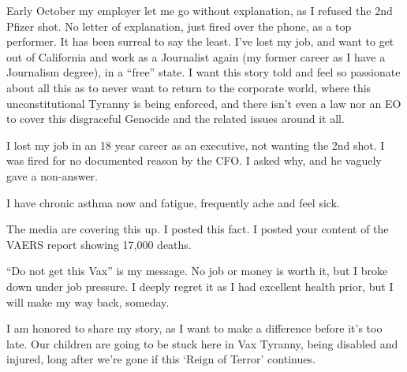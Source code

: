 Early October my employer let me go without explanation, as I refused the 2nd
Pfizer shot. No letter of explanation, just fired over the phone, as a top
performer. It has been surreal to say the least. I’ve lost my job, and want to
get out of California and work as a Journalist again (my former career as I have
a Journalism degree), in a “free” state. I want this story told and feel so
passionate about all this as to never want to return to the corporate world,
where this unconstitutional Tyranny is being enforced, and there isn’t even a
law nor an EO to cover this disgraceful Genocide and the related issues around
it all.

I lost my job in an 18 year career as an executive, not wanting the 2nd shot. I
was fired for no documented reason by the CFO. I asked why, and he vaguely gave
a non-answer.

I have chronic asthma now and fatigue, frequently ache and feel sick.

The media are covering this up. I posted this fact. I posted your content of the
VAERS report showing 17,000 deaths.

“Do not get this Vax” is my message. No job or money is worth it, but I broke
down under job pressure. I deeply regret it as I had excellent health prior, but
I will make my way back, someday.

I am honored to share my story, as I want to make a difference before it’s too
late. Our children are going to be stuck here in Vax Tyranny, being disabled and
injured, long after we’re gone if this ‘Reign of Terror’ continues.

